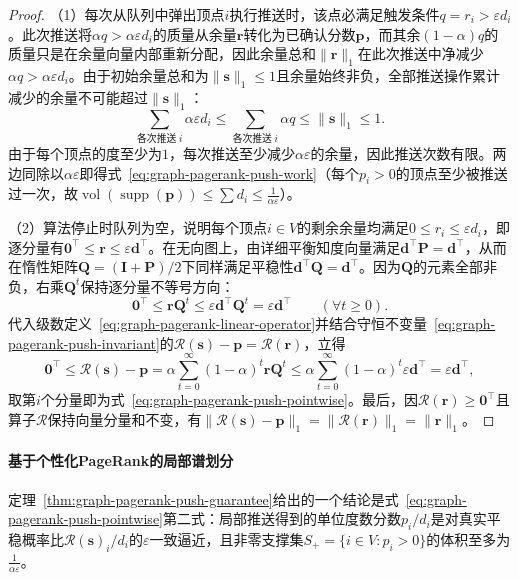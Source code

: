 \begin{proof}
（1）每次从队列中弹出顶点$i$执行推送时，该点必满足触发条件$q=r_i>\varepsilon d_i$。此次推送将$\alpha q>\alpha\varepsilon d_i$的质量从余量$\bm r$转化为已确认分数$\bm p$，而其余$(1-\alpha)q$的质量只是在余量向量内部重新分配，因此余量总和$\lVert\bm r\rVert_1$在此次推送中净减少$\alpha q>\alpha\varepsilon d_i$。由于初始余量总和为$\lVert\bm s\rVert_1\leq 1$且余量始终非负，全部推送操作累计减少的余量不可能超过$\lVert\bm s\rVert_1$：
\[
  \sum_{\text{各次推送}\;i}\alpha\varepsilon d_i \leq \sum_{\text{各次推送}\;i}\alpha q \leq \lVert\bm s\rVert_1\leq 1.
\]
由于每个顶点的度至少为$1$，每次推送至少减少$\alpha\varepsilon$的余量，因此推送次数有限。两边同除以$\alpha\varepsilon$即得式~\eqref{eq:graph-pagerank-push-work}（每个$p_i>0$的顶点至少被推送过一次，故$\operatorname{vol}(\operatorname{supp}(\bm p))\leq\sum d_i\leq\frac{1}{\alpha\varepsilon}$）。

（2）算法停止时队列为空，说明每个顶点$i\in V$的剩余余量均满足$0\leq r_i\leq\varepsilon d_i$，即逐分量有$\bm 0^\top\leq\bm r\leq\varepsilon\bm d^\top$。在无向图上，由详细平衡知度向量满足$\bm d^\top\bm P=\bm d^\top$，从而在惰性矩阵$\bm Q=(\bm I+\bm P)/2$下同样满足平稳性$\bm d^\top\bm Q=\bm d^\top$。因为$\bm Q$的元素全部非负，右乘$\bm Q^t$保持逐分量不等号方向：
\[
  \bm 0^\top\leq\bm r\bm Q^t\leq\varepsilon\bm d^\top\bm Q^t=\varepsilon\bm d^\top\qquad(\forall t\geq 0).
\]
代入级数定义~\eqref{eq:graph-pagerank-linear-operator}并结合守恒不变量~\eqref{eq:graph-pagerank-push-invariant}的$\mathcal R(\bm s)-\bm p=\mathcal R(\bm r)$，立得
\[
  \bm 0^\top\leq\mathcal R(\bm s)-\bm p=\alpha\sum_{t=0}^\infty(1-\alpha)^t\bm r\bm Q^t\leq\alpha\sum_{t=0}^\infty(1-\alpha)^t\varepsilon\bm d^\top=\varepsilon\bm d^\top,
\]
取第$i$个分量即为式~\eqref{eq:graph-pagerank-push-pointwise}。最后，因$\mathcal R(\bm r)\geq\bm 0^\top$且算子$\mathcal R$保持向量分量和不变，有$\lVert\mathcal R(\bm s)-\bm p\rVert_1=\lVert\mathcal R(\bm r)\rVert_1=\lVert\bm r\rVert_1$。
\end{proof}

\paragraph{基于个性化PageRank的局部谱划分}

定理~\ref{thm:graph-pagerank-push-guarantee}给出的一个结论是式~\eqref{eq:graph-pagerank-push-pointwise}第二式：局部推送得到的单位度数分数$p_i/d_i$是对真实平稳概率比$\mathcal R(\bm s)_i/d_i$的$\varepsilon$一致逼近，且非零支撑集$S_+=\{i\in V:p_i>0\}$的体积至多为$\frac{1}{\alpha\varepsilon}$。

